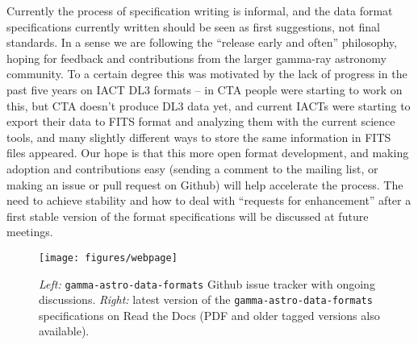 Currently the process of specification writing is informal, and the data format specifications currently written should be seen as first suggestions, not final standards. In a sense we are following the ``release early and often'' philosophy, hoping for feedback and contributions from the larger gamma-ray astronomy community. To a certain degree this was motivated by the lack of progress in the past five years on IACT DL3 formats -- in CTA people were starting to work on this, but CTA doesn't produce DL3 data yet, and current IACTs were starting to export their data to FITS format and analyzing them with the current science tools, and many slightly different ways to store the same information in FITS files appeared. Our hope is that this more open format development, and making adoption and contributions easy (sending a comment to the mailing list, or making an issue or pull request on Github) will help accelerate the process. The need to achieve stability and how to deal with ``requests for enhancement'' after a first stable version of the format specifications will be discussed at future meetings.

\begin{figure}[tb]
\centerline{\texttt{[image: figures/webpage]}}
\caption{
\emph{Left:} \texttt{gamma-astro-data-formats} Github issue tracker with ongoing discussions. \emph{Right:} latest version of the \texttt{gamma-astro-data-formats} specifications on Read the Docs (PDF and older tagged versions also available).
}
\label{fig:webpage}
\end{figure}
